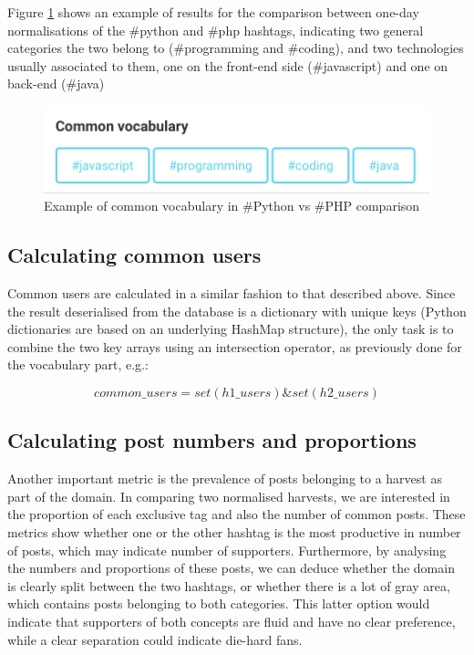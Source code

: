 \documentclass[12pt,a4paper,twoside]{report}
\begin{document}
Figure \ref{fig:commonvocab} shows an example of results for the comparison between one-day normalisations of the \#python and \#php hashtags, indicating two general categories the two belong to (\#programming and \#coding), and two technologies usually associated to them, one on the front-end side (\#javascript) and one on back-end (\#java)

\begin{figure}
    \centering
\includegraphics[width=0.5\columnwidth]{img/commonvocab.png}
    \caption{Example of common vocabulary in \#Python vs \#PHP comparison}
    \label{fig:commonvocab}
\end{figure}

\subsection{Calculating common users}
Common users are calculated in a similar fashion to that described above. Since the result deserialised from the database is a dictionary with unique keys (Python dictionaries are based on an underlying HashMap structure), the only task is to combine the two key arrays using an intersection operator, as previously done for the vocabulary part, e.g.:

\[common\_users = set(h1\_users) \& set(h2\_users)\]

\subsection{Calculating post numbers and proportions}
Another important metric is the prevalence of posts belonging to a harvest as part of the domain. In comparing two normalised harvests, we are interested in the proportion of each exclusive tag and also the number of common posts. These metrics show whether one or the other hashtag is the most productive in number of posts, which may indicate number of supporters. Furthermore, by analysing the numbers and proportions of these posts, we can deduce whether the domain is clearly split between the two hashtags, or whether there is a lot of gray area, which contains posts belonging to both categories. This latter option would indicate that supporters of both concepts are fluid and have no clear preference, while a clear separation could indicate die-hard fans.
\end{document}
